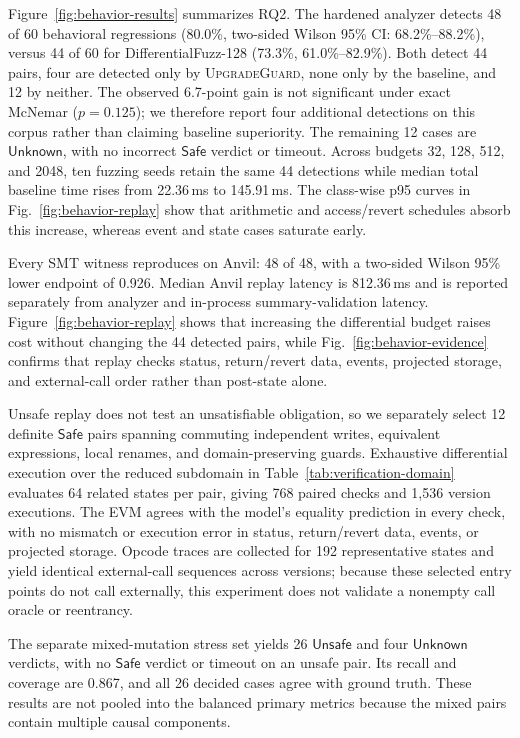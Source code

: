 \documentclass[runningheads]{llncs}
\newcommand{\tool}{\textsc{UpgradeGuard}\xspace}
\newcommand{\Safe}{\mathsf{Safe}}
\newcommand{\Unsafe}{\mathsf{Unsafe}}
\newcommand{\Unknown}{\mathsf{Unknown}}
\begin{document}
Figure~\ref{fig:behavior-results} summarizes RQ2. The hardened analyzer detects 48 of 60 behavioral regressions (80.0\%, two-sided Wilson 95\% CI: 68.2\%--88.2\%), versus 44 of 60 for DifferentialFuzz-128 (73.3\%, 61.0\%--82.9\%). Both detect 44 pairs, four are detected only by \tool, none only by the baseline, and 12 by neither. The observed 6.7-point gain is not significant under exact McNemar (\(p=0.125\)); we therefore report four additional detections on this corpus rather than claiming baseline superiority. The remaining 12 cases are \(\Unknown\), with no incorrect \(\Safe\) verdict or timeout. Across budgets 32, 128, 512, and 2048, ten fuzzing seeds retain the same 44 detections while median total baseline time rises from 22.36\,ms to 145.91\,ms. The class-wise p95 curves in Fig.~\ref{fig:behavior-replay} show that arithmetic and access/revert schedules absorb this increase, whereas event and state cases saturate early.

Every SMT witness reproduces on Anvil: 48 of 48, with a two-sided Wilson 95\% lower endpoint of 0.926. Median Anvil replay latency is 812.36\,ms and is reported separately from analyzer and in-process summary-validation latency. Figure~\ref{fig:behavior-replay} shows that increasing the differential budget raises cost without changing the 44 detected pairs, while Fig.~\ref{fig:behavior-evidence} confirms that replay checks status, return/revert data, events, projected storage, and external-call order rather than post-state alone.

Unsafe replay does not test an unsatisfiable obligation, so we separately select 12 definite \(\Safe\) pairs spanning commuting independent writes, equivalent expressions, local renames, and domain-preserving guards. Exhaustive differential execution over the reduced subdomain in Table~\ref{tab:verification-domain} evaluates 64 related states per pair, giving 768 paired checks and 1,536 version executions. The EVM agrees with the model's equality prediction in every check, with no mismatch or execution error in status, return/revert data, events, or projected storage. Opcode traces are collected for 192 representative states and yield identical external-call sequences across versions; because these selected entry points do not call externally, this experiment does not validate a nonempty call oracle or reentrancy.

The separate mixed-mutation stress set yields 26 \(\Unsafe\) and four \(\Unknown\) verdicts, with no \(\Safe\) verdict or timeout on an unsafe pair. Its recall and coverage are 0.867, and all 26 decided cases agree with ground truth. These results are not pooled into the balanced primary metrics because the mixed pairs contain multiple causal components.
\end{document}
